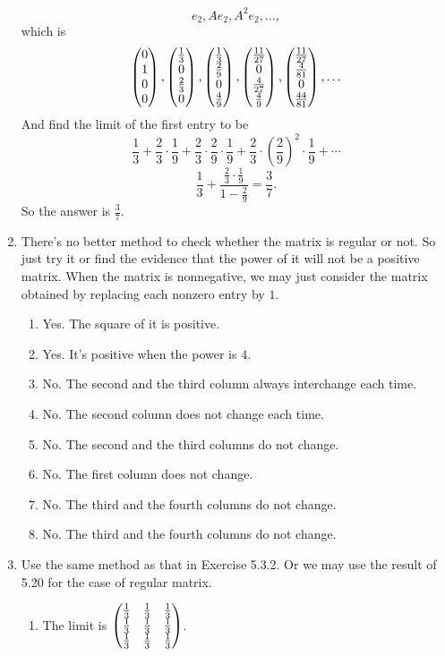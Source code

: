 \begin{enumerate}
\[e_2, Ae_2, A^2e_2, \ldots,\]
which is 
\[\begin{pmatrix}0\cr 1\cr 0\cr 0\end{pmatrix},\begin{pmatrix}\frac{1}{3}\cr 0\cr \frac{2}{3}\cr 0\end{pmatrix},\begin{pmatrix}\frac{1}{3}\cr \frac{2}{9}\cr 0\cr \frac{4}{9}\end{pmatrix},\begin{pmatrix}\frac{11}{27}\cr 0\cr \frac{4}{27}\cr \frac{4}{9}\end{pmatrix},\begin{pmatrix}\frac{11}{27}\cr \frac{4}{81}\cr 0\cr \frac{44}{81}\end{pmatrix},\ldots\]
And find the limit of the first entry to be 
\[\frac{1}{3}+\frac{2}{3}\cdot \frac{1}{9}+\frac{2}{3}\cdot\frac{2}{9}\cdot\frac{1}{9}+\frac{2}{3}\cdot(\frac{2}{9})^2\cdot\frac{1}{9}+\cdots\]
\[\frac{1}{3}+\frac{\frac{2}{3}\cdot\frac{1}{9}}{1-\frac{2}{9}}=\frac{3}{7}.\]
So the answer is $\frac{3}{7}$.
\item There's no better method to check whether the matrix is regular or not. So just try it or find the evidence that the power of it will not be a positive matrix. When the matrix is nonnegative, we may just consider the matrix obtained by replacing each nonzero entry by $1$.
\begin{enumerate}
\item Yes. The square of it is positive.
\item Yes. It's positive when the power is $4$.
\item No. The second and the third column always interchange each time.
\item No. The second column does not change each time.
\item No. The second and the third columns do not change.
\item No. The first column does not change.
\item No. The third and the fourth columns do not change.
\item No. The third and the fourth columns do not change.
\end{enumerate}
\item Use the same method as that in Exercise 5.3.2. Or we may use the result of 5.20 for the case of regular matrix.
\begin{enumerate}
\item The limit is $\begin{pmatrix}\frac{1}{3} & \frac{1}{3} & \frac{1}{3}\cr \frac{1}{3} & \frac{1}{3} & \frac{1}{3}\cr \frac{1}{3} & \frac{1}{3} & \frac{1}{3}\end{pmatrix}$.

\end{enumerate}
\end{enumerate}

